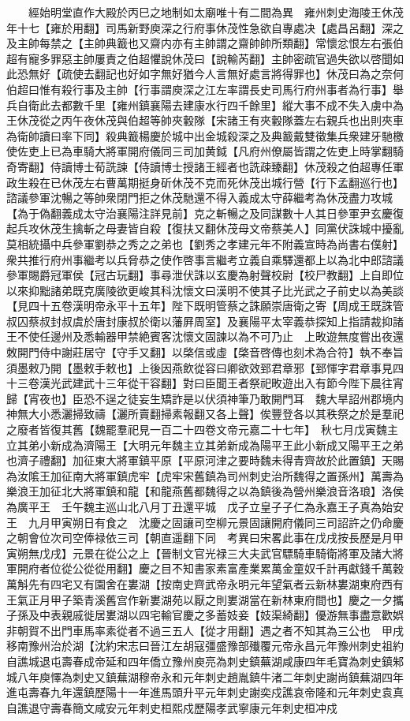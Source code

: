 　　經始明堂直作大殿於丙巳之地制如太廟唯十有二間為異　雍州刺史海陵王休茂年十七【雍於用翻】司馬新野庾深之行府事休茂性急欲自專處决【處昌呂翻】深之及主帥每禁之【主帥典籖也又齋内亦有主帥謂之齋帥帥所類翻】常懷忿恨左右張伯超有寵多罪惡主帥屢責之伯超懼說休茂曰【說輸芮翻】主帥密疏官過失欲以啓聞如此恐無好【疏使去翻記也好如字無好猶今人言無好處言將得罪也】休茂曰為之奈何伯超曰惟有殺行事及主帥【行事謂庾深之江左率謂長史司馬行府州事者為行事】舉兵自衛此去都數千里【雍州鎮襄陽去建康水行四千餘里】縱大事不成不失入虜中為王休茂從之丙午夜休茂與伯超等帥夾轂隊【宋諸王有夾轂隊蓋左右親兵也出則夾車為衛帥讀曰率下同】殺典籖楊慶於城中出金城殺深之及典籖戴雙徵集兵衆建牙馳檄使佐吏上已為車騎大將軍開府儀同三司加黄鉞【凡府州僚屬皆謂之佐吏上時掌翻騎奇寄翻】侍讀博士荀詵諫【侍讀博士授諸王經者也詵疎臻翻】休茂殺之伯超專任軍政生殺在已休茂左右曹萬期挺身斫休茂不克而死休茂出城行營【行下孟翻巡行也】諮議參軍沈暢之等帥衆閉門拒之休茂馳還不得入義成太守薛繼考為休茂盡力攻城【為于偽翻義成太守治襄陽注詳見前】克之斬暢之及同謀數十人其日參軍尹玄慶復起兵攻休茂生擒斬之母妻皆自殺【復扶又翻休茂母文帝蔡美人】同黨伏誅城中擾亂莫相統攝中兵參軍劉恭之秀之之弟也【劉秀之孝建元年不附義宣時為尚書右僕射】衆共推行府州事繼考以兵脅恭之使作啓事言繼考立義自乘驛還都上以為北中郎諮議參軍賜爵冠軍侯【冠古玩翻】事尋泄伏誅以玄慶為射聲校尉【校尸教翻】上自即位以來抑黜諸弟既克廣陵欲更峻其科沈懷文曰漢明不使其子比光武之子前史以為美談【見四十五卷漢明帝永平十五年】陛下既明管蔡之誅願崇唐衛之寄【周成王既誅管叔囚蔡叔封叔虞於唐封康叔於衛以藩屛周室】及襄陽平太宰義恭探知上指請裁抑諸王不使任邊州及悉輸器甲禁絶賓客沈懷文固諫以為不可乃止　上畋遊無度嘗出夜還敇開門侍中謝莊居守【守手又翻】以棨信或虛【棨音啓傳也刻术為合符】執不奉旨須墨敕乃開【墨敕手敕也】上後因燕飲從容曰卿欲效郅君章邪【郅惲字君章事見四十三卷漢光武建武十三年從干容翻】對曰臣聞王者祭祀畋遊出入有節今陛下晨往宵歸【宵夜也】臣恐不逞之徒妄生矯詐是以伏須神筆乃敢開門耳　魏大旱詔州郡境内神無大小悉灑掃致禱【灑所賣翻掃素報翻又各上聲】俟豐登各以其秩祭之於是羣祀之廢者皆復其舊【魏罷羣祀見一百二十四卷文帝元嘉二十七年】　秋七月戊寅魏主立其弟小新成為濟陽王【大明元年魏主立其弟新成為陽平王此小新成又陽平王之弟也濟子禮翻】加征東大將軍鎮平原【平原河津之要時魏未得青齊故於此置鎮】天賜為汝隂王加征南大將軍鎮虎牢【虎牢宋舊鎮為司州刺史治所魏得之置孫州】萬壽為樂浪王加征北大將軍鎮和龍【和龍燕舊都魏得之以為鎮後為營州樂浪音洛琅】洛侯為廣平王　壬午魏主巡山北八月丁丑還平城　戊子立皇子子仁為永嘉王子真為始安王　九月甲寅朔日有食之　沈慶之固讓司空柳元景固讓開府儀同三司詔許之仍命慶之朝會位次司空俸禄依三司【朝直遥翻下同　考異曰宋畧此事在戊戌按長歷是月甲寅朔無戊戌】元景在從公之上【晉制文官光禄三大夫武官驃騎車騎衛將軍及諸大將軍開府者位從公從從用翻】慶之目不知書家素富產業累萬金童奴千計再獻錢千萬穀萬斛先有四宅又有園舍在婁湖【按南史齊武帝永明元年望氣者云新林婁湖東府西有王氣正月甲子築青溪舊宫作新婁湖苑以厭之則婁湖當在新林東府間也】慶之一夕攜子孫及中表親戚徙居婁湖以四宅輸官慶之多蓄妓妾【妓渠綺翻】優游無事盡意歡娯非朝賀不出門車馬率素從者不過三五人【從才用翻】遇之者不知其為三公也　甲戌移南豫州治於湖【沈約宋志曰晉江左胡寇彊盛豫部殱覆元帝永昌元年豫州刺史祖約自譙城退屯壽春成帝延和四年僑立豫州庾亮為刺史鎮蕪湖咸康四年毛寶為刺史鎮邾城八年庾懌為刺史又鎮蕪湖穆帝永和元年刺史趙胤鎮牛渚二年刺史謝尚鎮蕪湖四年進屯壽春九年還鎮歷陽十一年進馬頭升平元年刺史謝奕戍譙哀帝隆和元年刺史袁真自譙退守壽春簡文咸安元年刺史桓熙戍歷陽孝武寧康元年刺史桓冲戍